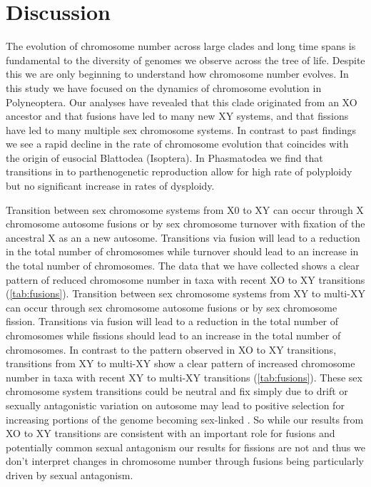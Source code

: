 \section{Discussion}
The evolution of chromosome number across large clades and long time spans is fundamental to the diversity of genomes we observe across the tree of life.
Despite this we are only beginning to understand how chromosome number evolves.
In this study we have focused on the dynamics of chromosome evolution in Polyneoptera. 
Our analyses have revealed that this clade originated from an XO ancestor and that fusions have led to many new XY systems, and that fissions have led to many multiple sex chromosome systems.
In contrast to past findings \citep{ross2015} we see a rapid decline in the rate of chromosome evolution that coincides with the origin of eusocial Blattodea (Isoptera).
In Phasmatodea we find that transitions in to parthenogenetic reproduction allow for high rate of polyploidy but no significant increase in rates of dysploidy.

Transition between sex chromosome systems from X0 to XY can occur through X chromosome autosome fusions or by sex chromosome turnover with fixation of the ancestral X as an a new autosome.
Transitions via fusion will lead to a reduction in the total number of chromosomes while turnover should lead to an increase in the total number of chromosomes.
The data that we have collected shows a clear pattern of reduced chromosome number in taxa with recent XO to XY transitions (\cref{tab:fusions}).
Transition between sex chromosome systems from XY to multi-XY can occur through sex chromosome autosome fusions or by sex chromosome fission.
Transitions via fusion will lead to a reduction in the total number of chromosomes while fissions should lead to an increase in the total number of chromosomes.
In contrast to the pattern observed in XO to XY transitions, transitions from XY to multi-XY show a clear pattern of increased chromosome number in taxa with recent XY to multi-XY transitions (\cref{tab:fusions}).
These sex chromosome system transitions could be neutral and fix simply due to drift or sexually antagonistic variation on autosome may lead to positive selection for increasing portions of the genome becoming sex-linked \citep{charlesworth1980, kitano2012}.
So while our results from XO to XY transitions are consistent with an important role for fusions and potentially common sexual antagonism our results for fissions are not and thus we don't interpret changes in chromosome number through fusions being particularly driven by sexual antagonism. 

